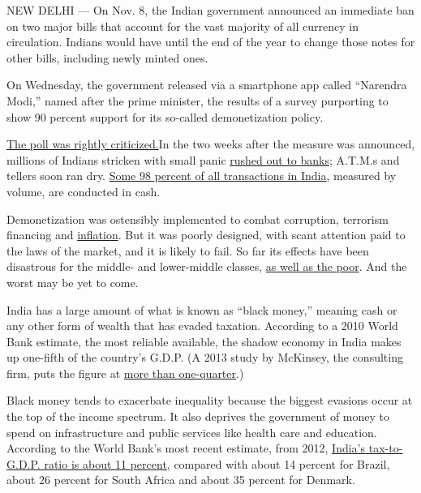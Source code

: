 NEW DELHI --- On Nov. 8, the Indian government announced an immediate
ban on two major bills that account for the vast majority of all
currency in circulation. Indians would have until the end of the year to
change those notes for other bills, including newly minted ones.

On Wednesday, the government released via a smartphone app called
``Narendra Modi,'' named after the prime minister, the results of a
survey purporting to show 90 percent support for its so-called
demonetization policy.

\href{http://scroll.in/article/822358/the-daily-fix-modis-cynical-app-survey-betrays-the-governments-insensitivity-on-demonetisation}{The
poll was rightly criticized.}In the two weeks after the measure was
announced, millions of Indians stricken with small panic
\href{http://www.nytimes.com/2016/11/09/business/india-bans-largest-currency-bills-for-now-n-bid-to-cut-corruption.html}{rushed
out to banks}; A.T.M.s and tellers soon ran dry.
\href{http://www.bloombergquint.com/business/2016/11/09/the-beginning-of-the-end-of-the-parallel-economy-in-india}{Some
98 percent of all transactions in India}, measured by volume, are
conducted in cash.

Demonetization was ostensibly implemented to combat corruption,
terrorism financing and
\href{http://www.narendramodi.in/text-of-prime-minister-s-address-to-the-nation-533024}{inflation}.
But it was poorly designed, with scant attention paid to the laws of the
market, and it is likely to fail. So far its effects have been
disastrous for the middle- and lower-middle classes,
\href{http://scroll.in/article/822101/how-four-families-have-survived-two-weeks-of-demonetisation}{as
well as the poor}. And the worst may be yet to come.

India has a large amount of what is known as ``black money,'' meaning
cash or any other form of wealth that has evaded taxation. According to
a 2010 World Bank estimate, the most reliable available, the shadow
economy in India makes up one-fifth of the country's G.D.P. (A 2013
study by McKinsey, the consulting firm, puts the figure at
\href{http://webcache.googleusercontent.com/search?q=cache:jQBKN2vqEa0J:www.mckinsey.com/\%7E/media/mckinsey/dotcom/client_service/financial\%2520services/latest\%2520thinking/payments/mop16_forging_a_path_to_payments_digitization.ashx+\&cd=1\&hl=en\&ct=clnk\&gl}{more
than one-quarter}.)

Black money tends to exacerbate inequality because the biggest evasions
occur at the top of the income spectrum. It also deprives the government
of money to spend on infrastructure and public services like health care
and education. According to the World Bank's most recent estimate, from
2012,
\href{https://issuu.com/world.bank.publications/docs/9781464806834?e=0/35179276}{India's
tax-to-G.D.P. ratio is about 11 percent}, compared with about 14 percent
for Brazil, about 26 percent for South Africa and about 35 percent for
Denmark.

